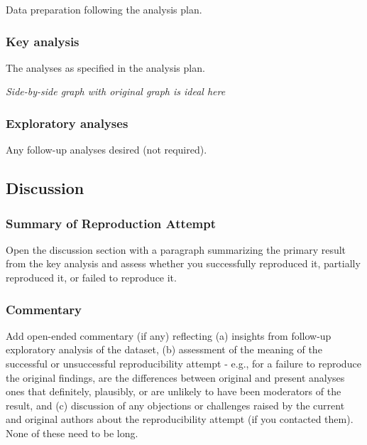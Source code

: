 \documentclass[
  letterpaper,
  DIV=11,
  numbers=noendperiod]{scrartcl}
\begin{document}
Data preparation following the analysis plan.

\subsubsection{Key analysis}\label{key-analysis}

The analyses as specified in the analysis plan.

\emph{Side-by-side graph with original graph is ideal here}

\subsubsection{Exploratory analyses}\label{exploratory-analyses}

Any follow-up analyses desired (not required).

\subsection{Discussion}\label{discussion}

\subsubsection{Summary of Reproduction
Attempt}\label{summary-of-reproduction-attempt}

Open the discussion section with a paragraph summarizing the primary
result from the key analysis and assess whether you successfully
reproduced it, partially reproduced it, or failed to reproduce it.

\subsubsection{Commentary}\label{commentary}

Add open-ended commentary (if any) reflecting (a) insights from
follow-up exploratory analysis of the dataset, (b) assessment of the
meaning of the successful or unsuccessful reproducibility attempt -
e.g., for a failure to reproduce the original findings, are the
differences between original and present analyses ones that definitely,
plausibly, or are unlikely to have been moderators of the result, and
(c) discussion of any objections or challenges raised by the current and
original authors about the reproducibility attempt (if you contacted
them). None of these need to be long.
\end{document}
